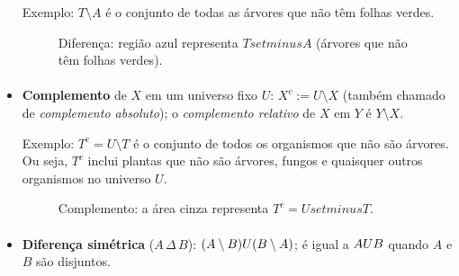 \documentclass[12pt,a4paper]{article}
\def\\{}%
\def\cup{\string U}%
\begin{document}
\begin{itemize}
    Exemplo: \(T \setminus A\) é o conjunto de todas as árvores que não têm folhas verdes.
    \begin{figure}[H]
    \centering
    \caption{Diferença: região azul representa $T\\setminus A$ (árvores que não têm folhas verdes).}
    \label{fig:op-diferenca}
    \end{figure}
    
    \paragraph{}
    \item \textbf{Complemento} de \(X\) em um universo fixo \(U\): \(X^c := U\setminus X\) (também chamado de \textit{complemento absoluto}); o \textit{complemento relativo} de \(X\) em \(Y\) é \(Y\setminus X\).
    
    Exemplo: \(T^c = U \setminus T\) é o conjunto de todos os organismos que não são árvores. Ou seja, \(T^c\) inclui plantas que não são árvores, fungos e quaisquer outros organismos no universo \(U\).
    \begin{figure}[H]
    \centering
    \caption{Complemento: a área cinza representa $T^c = U\\setminus T$.}
    \label{fig:op-complemento}
    \end{figure}

    \paragraph{}
    \item \textbf{Diferença simétrica} (\(A\,\Delta\, B\)): \((A\setminus B)\cup(B\setminus A)\); é igual a \(A\cup B\) quando \(A\) e \(B\) são disjuntos.
    

\end{itemize}
\end{document}
